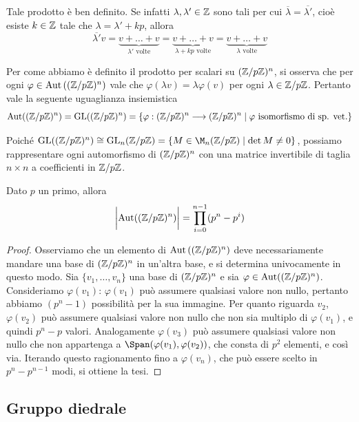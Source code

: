 \documentclass[11pt]{scrartcl}
\begin{document}
	
	Tale prodotto è ben definito. Se infatti $\lambda, \lambda' \in \mathbb Z$ sono tali per cui
	$\overline{\lambda} = \overline{\lambda'}$, cioè esiste $k \in \mathbb Z$ tale che
	$\lambda = \lambda' + kp$, allora \[
	\overline{\lambda'} v = \underset{\lambda'\text{ volte}}{\underbrace{v + \ldots + v}} = 
	\underset{\lambda + kp\text{ volte}}{\underbrace{v + \ldots + v}} = 
	\underset{\lambda\text{ volte}}{\underbrace{v + \ldots + v}}
	\]
	
	
	Per come abbiamo è definito il prodotto per scalari su $({\mathbb Z}/p{\mathbb Z})^n$, si osserva che per ogni
	$\varphi \in \operatorname{Aut}\left(({\mathbb Z}/p{\mathbb Z})^n\right)$ vale che $\varphi(\lambda v) = \lambda\varphi(v)$ 
	per ogni $\lambda \in {\mathbb Z}/p{\mathbb Z}$. Pertanto vale la seguente uguaglianza insiemistica
	\[
	\operatorname{Aut}(({\mathbb Z}/p{\mathbb Z})^n) = \operatorname{GL}(({\mathbb Z}/p{\mathbb Z})^n) = \{\varphi: ({\mathbb Z}/p{\mathbb Z})^n\longrightarrow({\mathbb Z}/p{\mathbb Z})^n
	\mid\varphi\text{ isomorfismo di sp. vet.}\}
	\]
	
	Poiché $\GL((\Zp)^n) \cong \GL_n(\Zp) = \{M \in \M_{n}(\Zp)\mid \det M \neq 0\}$,
	possiamo rappresentare ogni automorfismo di $({\mathbb Z}/p{\mathbb Z})^n$ con una matrice invertibile
	di taglia $n\times n$ a coefficienti in ${\mathbb Z}/p{\mathbb Z}$.
	
	\begin{proposition}
		\label{prop:aut_zpn}
		Dato $p$ un primo, allora \[
		\bigg| \! \operatorname{Aut}(({\mathbb Z}/p{\mathbb Z})^n) \bigg| = \prod_{i = 0}^{n - 1} (p^n - p^i)
		\]
	\end{proposition}
	
	\begin{proof}
		Osserviamo che un elemento di $\operatorname{Aut}\left(({\mathbb Z}/p{\mathbb Z})^n\right)$ deve necessariamente mandare 
		una base di $({\mathbb Z}/p{\mathbb Z})^n$ in un'altra base, e si determina univocamente in questo 
		modo. Sia $\{v_1, \ldots, v_n\}$ una base di $({\mathbb Z}/p{\mathbb Z})^n$ e sia $\varphi \in 
		\operatorname{Aut}(({\mathbb Z}/p{\mathbb Z})^n)$. Consideriamo $\varphi(v_1)$: $\varphi(v_1)$ può assumere
		qualsiasi valore non nullo, pertanto abbiamo $(p^n - 1)$ possibilità per 
		la sua immagine. Per quanto riguarda $v_2$, $\varphi(v_2)$
		può assumere qualsiasi valore non nullo che non sia multiplo di $\varphi(v_1)$, e quindi
		$p^n - p$ valori. Analogamente $\varphi(v_3)$ può assumere qualsiasi
		valore non nullo che non appartenga a $\Span(\varphi(v_1), \varphi(v_2))$, che consta di
		$p^2$ elementi, e così via. Iterando questo ragionamento fino a $\varphi(v_n)$,
		che può essere scelto in $p^n - p^{n - 1}$ modi, si ottiene la tesi.
	\end{proof}
	
	\newpage
	
	\subsection{Gruppo diedrale}
	
\end{document}
